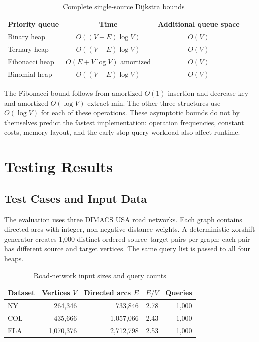 \documentclass[12pt,a4paper]{report}
\begin{document}
\begin{table}[H]
  \centering
  \caption{Complete single-source Dijkstra bounds}
  \label{tab:complexity}
  \begin{tabular}{lcc}
    \toprule
    Priority queue & Time & Additional queue space \\
    \midrule
    Binary heap & $O((V+E)\log V)$ & $O(V)$ \\
    Ternary heap & $O((V+E)\log V)$ & $O(V)$ \\
    Fibonacci heap & $O(E+V\log V)$ amortized & $O(V)$ \\
    Binomial heap & $O((V+E)\log V)$ & $O(V)$ \\
    \bottomrule
  \end{tabular}
\end{table}

The Fibonacci bound follows from amortized $O(1)$ insertion and decrease-key
and amortized $O(\log V)$ extract-min. The other three structures use
$O(\log V)$ for each of these operations. These asymptotic bounds do not by
themselves predict the fastest implementation: operation frequencies,
constant costs, memory layout, and the early-stop query workload also affect
runtime.

\chapter{Testing Results}

\section{Test Cases and Input Data}
The evaluation uses three DIMACS USA road networks. Each graph contains
directed arcs with integer, non-negative distance weights. A deterministic
xorshift generator creates 1,000 distinct ordered source--target pairs per
graph; each pair has different source and target vertices. The same query list
is passed to all four heaps.

\begin{table}[H]
  \centering
  \caption{Road-network input sizes and query counts}
  \label{tab:datasets}
  \begin{tabular}{lrrrr}
    \toprule
    Dataset & Vertices $V$ & Directed arcs $E$ & $E/V$ & Queries \\
    \midrule
    NY  & 264,346 & 733,846   & 2.78 & 1,000 \\
    COL & 435,666 & 1,057,066 & 2.43 & 1,000 \\
    FLA & 1,070,376 & 2,712,798 & 2.53 & 1,000 \\
    \bottomrule
  \end{tabular}
\end{table}
\end{document}
